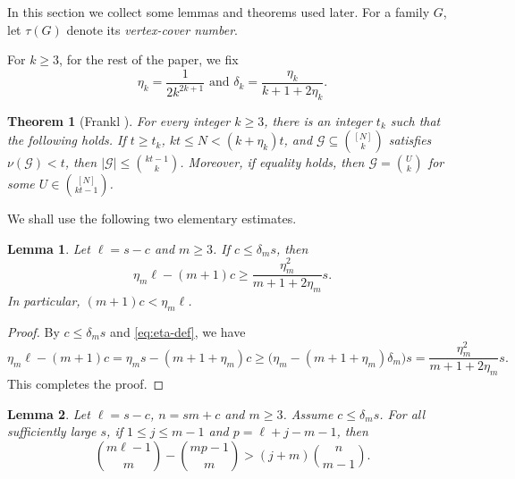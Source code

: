 \documentclass[10pt,a4paper]{article}
\numberwithin{equation}{section}
\newtheorem{theorem}{Theorem}[section]
\newtheorem{lemma}[lemma]{Lemma}
\theoremstyle{definition}
\newcommand{\G}{\mathcal G}
\begin{document}
In this section we collect some lemmas and theorems used later.
For a family $G$, let $\tau(G)$ denote its \emph{vertex-cover number}.




For $k\ge3$, for the rest of the paper, we fix
\begin{equation}\label{eq:eta-def}
        \eta_k=\frac{1}{2k^{2k+1}} \text{ and }\delta_k=\frac{\eta_k}{k+1+2\eta_k}.
\end{equation}

\begin{theorem}[Frankl \cite{Frankl2017NewRange}]\label{thm:npemc}
        For every integer $k\ge3$, there is an integer $t_k$ such that the following holds.
        If $t\ge t_k$, $kt\le N<(k+\eta_k)t$, and $\G\subseteq\binom{[N]}k$ satisfies $\nu(\G)<t$, then $|\G|\le \binom{kt-1}{k}$.
        Moreover, if equality holds, then $\G=\binom Uk$ for some $U\in\binom{[N]}{kt-1}$.
\end{theorem}


We shall use the following two elementary estimates.
\begin{lemma}\label{lem:window}
        Let $\ell=s-c$ and $m\ge3$.
        If $c\le\delta_m s$, then
        \[
                \eta_m\ell-(m+1)c
                \ge
                \frac{\eta_m^2}{m+1+2\eta_m}s.
        \]
        In particular, $(m+1)c<\eta_m\ell$.
\end{lemma}

\begin{proof}
        By $c\le\delta_m s$ and \eqref{eq:eta-def}, we have
        \[
                \eta_m\ell-(m+1)c
                =\eta_m s-(m+1+\eta_m)c
                \ge
                \bigl(\eta_m-(m+1+\eta_m)\delta_m\bigr)s=\frac{\eta_m^2}{m+1+2\eta_m}s.
        \]
        This completes the proof.
\end{proof}


\begin{lemma}\label{lem:gap}
        Let $\ell=s-c$, $n=sm+c$ and $m\ge3$.
        Assume $c\le\delta_m s$.
        For all sufficiently large $s$, if $1\le j\le m-1$ and $p=\ell+j-m-1$, then
        \[
                \binom{m\ell-1}{m}-
                \binom{mp-1}{m}
                >
                (j+m)\binom n{m-1}.
        \]
\end{lemma}
\end{document}

